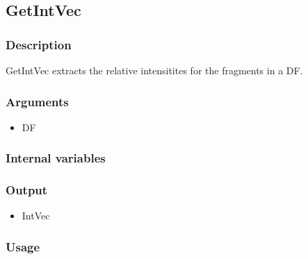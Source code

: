 \subsection{GetIntVec}
\subsubsection{Description}
GetIntVec extracts the relative intensitites for the fragments in a DF.
\subsubsection{Arguments}
\begin{itemize}
\item DF
\end{itemize}
\subsubsection{Internal variables}
\subsubsection{Output}
\begin{itemize}
\item IntVec
\end{itemize}
\subsubsection{Usage}
